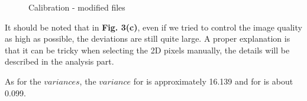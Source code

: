 \documentclass[a4paper]{article}
\begin{document}
\begin{figure}[htbp]
\centering
{}
\caption{Calibration - modified files}
\end{figure}

It should be noted that in \textbf{Fig. 3(c)}, even if we tried to control the image quality as high as possible, the deviations are still quite large. A proper explanation is that it can be tricky when selecting the 2D pixels manually, the details will be described in the analysis part.

As for the $variances$, the $variance$ for    is approximately 16.139 and for  is about 0.099.
\end{document}
